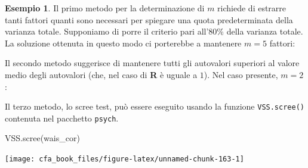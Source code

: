\documentclass[
  11pt,
]{krantz}
\makeatletter
\newenvironment{Shaded}{\begin{snugshade}}{\end{snugshade}}
\newcommand{\CommentTok}[1]{\textcolor[rgb]{0.37,0.37,0.37}{\textit{#1}}}
\newcommand{\DecValTok}[1]{\textcolor[rgb]{0.06,0.06,0.06}{#1}}
\newcommand{\FunctionTok}[1]{\textcolor[rgb]{0,0,0}{#1}}
\newcommand{\NormalTok}[1]{#1}
\newcommand{\OtherTok}[1]{\textcolor[rgb]{0.37,0.37,0.37}{#1}}
\newcommand{\SpecialCharTok}[1]{\textcolor[rgb]{0,0,0}{#1}}
\newenvironment{kframe}{%
\medskip{}
\setlength{\fboxsep}{.8em}
 \def\at@end@of@kframe{}%
 \ifinner\ifhmode%
  \def\at@end@of@kframe{\end{minipage}}%
  \begin{minipage}{\columnwidth}%
 \fi\fi%
 \def\FrameCommand##1{\hskip\@totalleftmargin \hskip-\fboxsep
 \colorbox{shadecolor}{##1}\hskip-\fboxsep
     \hskip-\linewidth \hskip-\@totalleftmargin \hskip\columnwidth}%
 \MakeFramed {\advance\hsize-\width
   \@totalleftmargin\z@ \linewidth\hsize
   \@setminipage}}%
 {\par\unskip\endMakeFramed%
 \at@end@of@kframe}
\renewenvironment{Shaded}{\begin{kframe}}{\end{kframe}}
\theoremstyle{definition}
\theoremstyle{definition}
\newtheorem{example}{Esempio}[chapter]
\theoremstyle{definition}
\theoremstyle{definition}
\theoremstyle{remark}
\makeatother
\begin{document}
\begin{example}
Il primo metodo per la determinazione di \(m\) richiede di estrarre tanti fattori quanti sono necessari per spiegare una quota predeterminata della varianza totale. Supponiamo di porre il criterio pari all'80\% della varianza totale. La soluzione ottenuta in questo modo ci porterebbe a mantenere \(m=5\) fattori:

\begin{Shaded}
\end{Shaded}

Il secondo metodo suggerisce di mantenere tutti gli autovalori superiori al valore medio degli autovalori (che, nel caso di \textbf{R} è uguale a \(1\)). Nel caso presente, \(m=2\):

\begin{Shaded}
\end{Shaded}

Il terzo metodo, lo scree test, può essere eseguito usando la funzione \texttt{VSS.scree()} contenuta nel pacchetto \texttt{psych}.

\begin{Shaded}
\begin{Highlighting}[]
\FunctionTok{VSS.scree}\NormalTok{(wais\_cor)}
\end{Highlighting}
\end{Shaded}

\begin{center}\texttt{[image: cfa\_book\_files/figure-latex/unnamed-chunk-163-1]} \end{center}


\end{example}
\end{document}
